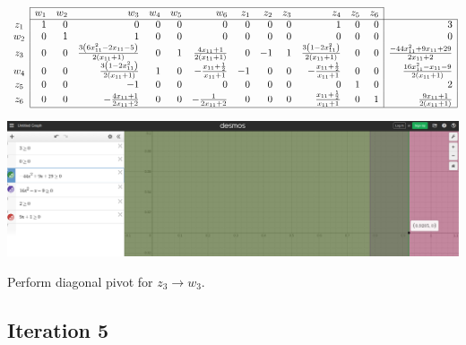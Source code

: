 \documentclass[12pt]{article}
\begin{document}
$\begin{array}{c|rrrrrrrrrrrr|r|}
\cline{2-13}
& w_1 & w_2 & w_3 & w_4 & w_5 & w_6 & z_1 & z_2 & z_3 & z_4 & z_5 & z_6 \\
\cline{2-14}
z_1 & 1 & 0 & 0 & 0 & 0 & 0 & 0 & 0 & 0 & 1 & 0 & 0 & 3 \\
w_2 & 0 & 1 & 1 & 0 & 0 & 0 & 0 & 0 & 0 & 0 & 0 & 0 & 0 \\
z_3 & 0 & 0 & \frac{3 \left(6 x_{11}^{2} - 2 x_{11} - 5\right)}{2 \left(x_{11} + 1\right)} & 0 & 1 & \frac{4 x_{11} + 1}{2 \left(x_{11} + 1\right)} & 0 & -1 & 1 & \frac{3 \left(1 - 2 x_{11}^{2}\right)}{2 \left(x_{11} + 1\right)} & 0 & 0 & \frac{- 44 x_{11}^{2} + 9 x_{11} + 29}{2 x_{11} + 2} \\
w_4 & 0 & 0 & \frac{3 \left(1 - 2 x_{11}^{2}\right)}{2 \left(x_{11} + 1\right)} & 1 & 0 & - \frac{x_{11} + \frac{1}{2}}{x_{11} + 1} & -1 & 0 & 0 & - \frac{x_{11} + \frac{1}{2}}{x_{11} + 1} & 0 & 0 & \frac{16 x_{11}^{2} - x_{11} - 9}{2 \left(x_{11} + 1\right)} \\
z_5 & 0 & 0 & -1 & 0 & 0 & 0 & 0 & 0 & 0 & 0 & 1 & 0 & 2 \\
z_6 & 0 & 0 & - \frac{4 x_{11} + 1}{2 x_{11} + 2} & 0 & 0 & - \frac{1}{2 x_{11} + 2} & 0 & 0 & 0 & \frac{x_{11} + \frac{1}{2}}{x_{11} + 1} & 0 & 1 & \frac{9 x_{11} + 1}{2 \left(x_{11} + 1\right)} \\
\cline{2-14}
\end{array}$

\begin{center}
\includegraphics[scale=.3]{Phase2_iteration4_visual}
\end{center}

Perform diagonal pivot for $z_3 \rightarrow w_3$.


\subsection*{Iteration 5}
\end{document}
